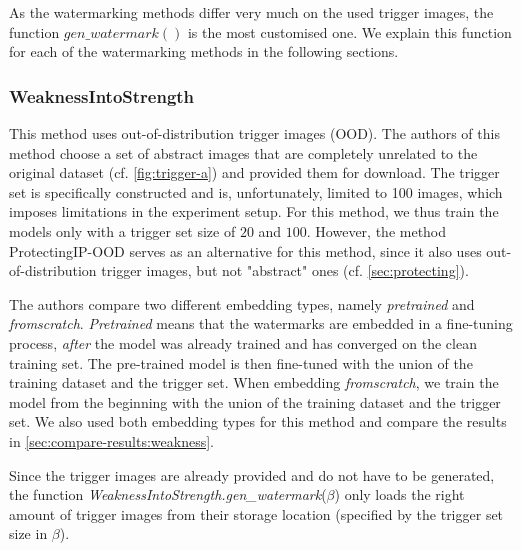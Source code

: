 As the watermarking methods differ very much on the used trigger images, the function $gen\_watermark()$ is the most customised one. We explain this function for each of the watermarking methods in the following sections.




\subsubsection{WeaknessIntoStrength}
\label{sec:weakness}

This method uses out-of-distribution trigger images (OOD). The authors of this method choose a set of abstract images that are completely unrelated to the original dataset (cf. \cref{fig:trigger-a}) and provided them for download. The trigger set is specifically constructed and is, unfortunately, limited to 100 images, which imposes limitations in the experiment setup. For this method, we thus train the models only with a trigger set size of $20$ and $100$.
However, the method ProtectingIP-OOD serves as an alternative for this method, since it also uses out-of-distribution trigger images, but not "abstract" ones (cf. \cref{sec:protecting}).

The authors compare two different embedding types, namely \textit{pretrained} and \textit{fromscratch}. \textit{Pretrained} means that the watermarks are embedded in a fine-tuning process, \textit{after} the model was already trained and has converged on the clean training set. The pre-trained model is then fine-tuned with the union of the training dataset and the trigger set. When embedding \textit{fromscratch}, we train the model from the beginning with the union of the training dataset and the trigger set. We also used both embedding types for this method and compare the results in \cref{sec:compare-results:weakness}.

Since the trigger images are already provided and do not have to be generated, the function \textit{WeaknessIntoStrength.gen\_watermark}($\beta$) only loads the right amount of trigger images from their storage location (specified by the trigger set size in $\beta$).

